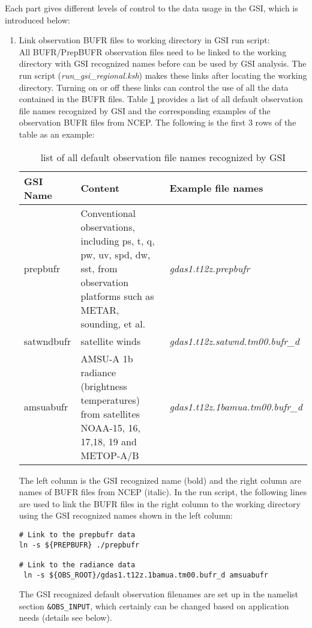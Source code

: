 Each part gives different levels of control to the data usage in the GSI, which is introduced below:

\begin{enumerate}[leftmargin=*]
\item Link observation BUFR files to working directory in GSI run script:\\

All BUFR/PrepBUFR observation files need to be linked to the working directory with GSI recognized names before can be used by GSI analysis. The run script (\textit{run\_gsi\_regional.ksh}) makes these links after locating the working directory. Turning on or off these links can control the use of all the data contained in the BUFR files. Table \ref{tab41} provides a list of all default observation file names recognized by GSI and the corresponding examples of the observation BUFR files from NCEP. The following is the first 3 rows of the table as an example:
\begin{table}[htbp]
\centering
\caption{list of all default observation file names recognized by GSI}
\begin{tabular}{|p{2cm}|p{9cm}|p{5cm}|}
\hline
\hline
GSI Name & Content & Example file names \\
\hline
prepbufr & Conventional observations, including ps, t, q, pw, uv, spd, dw, sst, from observation platforms such as METAR, sounding, et al. & \textit{gdas1.t12z.prepbufr} \\
\hline
satwndbufr & satellite winds &	\textit{gdas1.t12z.satwnd.tm00.bufr\_d} \\
\hline
amsuabufr & AMSU-A 1b radiance (brightness temperatures) from satellites NOAA-15, 16, 17,18, 19 and METOP-A/B &	\textit{gdas1.t12z.1bamua.tm00.bufr\_d} \\
\hline
\end{tabular}
\label{tab41}
\end{table} 

The left column is the GSI recognized name (bold) and the right column are names of BUFR files from NCEP (italic). In the run script, the following lines are used to link the BUFR files in the right column to the working directory using the GSI recognized names shown in the left column:

\begin{scriptsize}
\begin{verbatim}
# Link to the prepbufr data
ln -s ${PREPBUFR} ./prepbufr

# Link to the radiance data
 ln -s ${OBS_ROOT}/gdas1.t12z.1bamua.tm00.bufr_d amsuabufr
\end{verbatim}
\end{scriptsize}
The GSI recognized default observation filenames are set up in the namelist section \verb|&OBS_INPUT|, which certainly can be changed based on application needs (details see below). \\


\end{enumerate}
